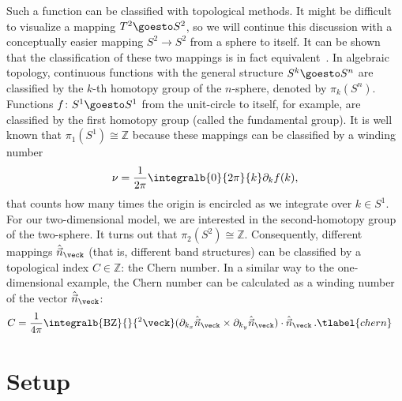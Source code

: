 Such a function can be classified with topological methods.
It might be difficult to visualize a mapping $T^2 \goesto S^2$, so we will continue this discussion with a conceptually easier mapping $S^2 \to S^2$ from a sphere to itself.
It can be shown that the classification of these two mappings is in fact equivalent~\cite{}.
In algebraic topology, continuous functions with the general structure $S^k \goesto S^n$ are classified by the $k$-th homotopy group of the $n$-sphere, denoted by $\pi_k(S^n)$.
Functions $f\colon S^1 \goesto S^1$ from the unit-circle to itself, for example, are classified by the first homotopy group (called the fundamental group).
It is well known that $\pi_1(S^1) \cong \mathds{Z}$ because these mappings can be classified by a winding number
\begin{align}
    \nu = \frac{1}{2\pi}\integralb{0}{2\pi}{k} \partial_k f(k), %
\end{align}
that counts how many times the origin is encircled as we integrate over $k \in S^1$.
For our two-dimensional model, we are interested in the second-homotopy group of the two-sphere.
It turns out that $\pi_2(S^2) \cong \mathds{Z}$.
Consequently, different mappings $\hat{\vec{n}}_\veck$ (that is, different band structures) can be classified by a topological index $C \in \mathds{Z}$: the Chern number.
In a similar way to the one-dimensional example, the Chern number can be calculated as a winding number of the vector $\hat{\vec{n}}_\veck$:
\begin{align}
    C &= \frac{1}{4\pi}\integralb{\text{BZ}}{}{^2\veck} ( \partial_{k_x} \hat{\vec{n}}_{\veck} \times \partial_{k_y} \hat{\vec{n}}_{\veck} ) \cdot \hat{\vec{n}}_{\veck} \, . \tlabel{chern}
\end{align}


\section{Setup}


